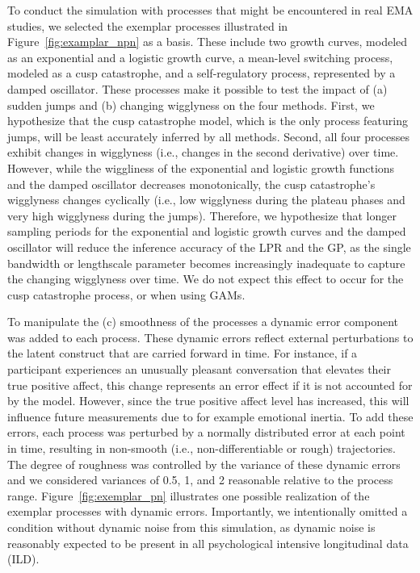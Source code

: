 \documentclass[man, floatsintext]{apa7}
\begin{document}
To conduct the simulation with processes that might be encountered in real EMA
studies, we selected the exemplar processes illustrated in
Figure~\ref{fig:examplar_npn} as a basis. These include two growth curves,
modeled as an exponential and a logistic growth curve, a mean-level switching
process, modeled as a cusp catastrophe, and a self-regulatory process,
represented by a damped oscillator. These processes make it possible to test
the impact of (a) sudden jumps and (b) changing wigglyness on the four methods.
First, we hypothesize that the cusp catastrophe model, which is the only
process featuring jumps, will be least accurately inferred by all methods.
Second, all four processes exhibit changes in wigglyness (i.e., changes in the
second derivative) over time. However, while the wiggliness of the exponential
and logistic growth functions and the damped oscillator decreases
monotonically, the cusp catastrophe's wigglyness changes cyclically (i.e., low
wigglyness during the plateau phases and very high wigglyness during the
jumps). Therefore, we hypothesize that longer sampling periods for the
exponential and logistic growth curves and the damped oscillator will reduce
the inference accuracy of the LPR and the GP, as the single bandwidth or
lengthscale parameter becomes increasingly inadequate to capture the changing
wigglyness over time. We do not expect this effect to occur for the cusp
catastrophe process, or when using GAMs.

To manipulate the (c) smoothness of the processes a dynamic error component was
added to each process. These dynamic errors reflect external perturbations to
the latent construct that are carried forward in time. For instance, if a
participant experiences an unusually pleasant conversation that elevates their
true positive affect, this change represents an error effect if it is not
accounted for by the model. However, since the true positive affect level has
increased, this will influence future measurements due to for example emotional
inertia. To add these errors, each process was perturbed by a normally
distributed error at each point in time, resulting in non-smooth (i.e.,
non-differentiable or rough) trajectories. The degree of roughness was
controlled by the variance of these dynamic errors and we considered variances
of 0.5, 1, and 2 reasonable relative to the process range.
Figure~\ref{fig:exemplar_pn} illustrates one possible realization of the
exemplar processes with dynamic errors. Importantly, we intentionally omitted a
condition without dynamic noise from this simulation, as dynamic noise is
reasonably expected to be present in all psychological intensive longitudinal
data (ILD).
\end{document}
